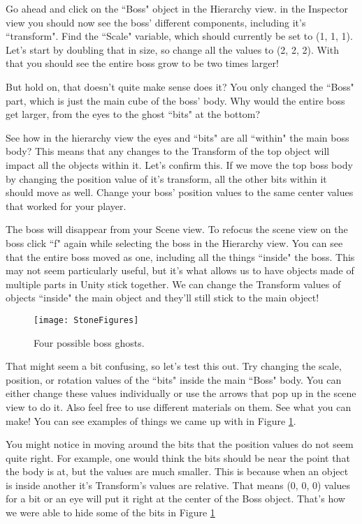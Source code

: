 \documentclass{article}
\begin{document}
Go ahead and click on the ``Boss" object in the Hierarchy view. in the Inspector view you should now see the boss' different components, including it's ``transform". Find the ``Scale" variable, which should currently be set to (1, 1, 1). Let's start by doubling that in size, so change all the values to (2, 2, 2). With that you should see the entire boss grow to be two times larger! 

But hold on, that doesn't quite make sense does it? You only changed the ``Boss" part, which is just the main cube of the boss' body. Why would the entire boss get larger, from the eyes to the ghost ``bits" at the bottom?

See how in the hierarchy view the eyes and ``bits" are all ``within" the main boss body? This means that any changes to the Transform of the top object will impact all the objects within it. Let's confirm this. If we move the top boss body by changing the position value of it's transform, all the other bits within it should move as well. Change your boss' position values to the same center values that worked for your player. 

The boss will disappear from your Scene view. To refocus the scene view on the boss click ``f" again while selecting the boss in the Hierarchy view. You can see that the entire boss moved as one, including all the things ``inside" the boss. This may not seem particularly useful, but it's what allows us to have objects made of multiple parts in Unity stick together. We can change the Transform values of objects ``inside" the main object and they'll still stick to the main object!

\begin{figure}
  \texttt{[image: StoneFigures]}
  \caption{Four possible boss ghosts.}
  \label{fig:StoneFigures}
\end{figure}

That might seem a bit confusing, so let's test this out. Try changing the scale, position, or rotation values of the ``bits" inside the main ``Boss" body. You can either change these values individually or use the arrows that pop up in the scene view to do it. Also feel free to use different materials on them. See what you can make! You can see examples of things we came up with in Figure \ref{fig:StoneFigures}. 

You might notice in moving around the bits that the position values do not seem quite right. For example, one would think the bits should be near the point that the body is at, but the values are much smaller. This is because when an object is inside another it's Transform's values are relative. That means (0, 0, 0) values for a bit or an eye will put it right at the center of the Boss object. That's how we were able to hide some of the bits in Figure \ref{fig:StoneFigures}
\end{document}
